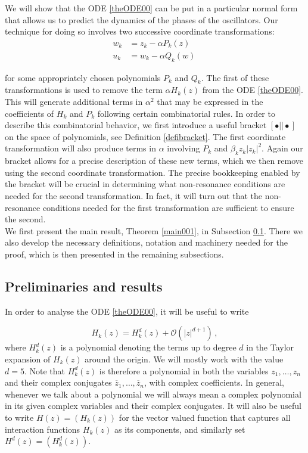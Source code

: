 \documentclass[12pt]{article}
\renewcommand{\mathcal}{\mathscr}
\theoremstyle{plain}
\theoremstyle{definition}
\theoremstyle{remark}
\theoremstyle{remark}
\begin{document}
We will show that the ODE \eqref{theODE00} can be put in a particular normal form that allows us to predict the dynamics of the phases of the oscillators. Our technique for doing so involves two successive coordinate transformations:
\begin{align}
  w_k &= z_k - \alpha P_k(z) \\ \nonumber
  u_k &= w_k - \alpha Q_k(w)\,
\end{align}

\noindent
for some appropriately chosen polynomials $P_k$ and $Q_k$. The first of these transformations is used to remove the term $\alpha H_k(z)$ from the ODE \eqref{theODE00}. This will generate additional terms in $\alpha^2$ that may be expressed in the coefficients of $H_k$ and $P_k$ following certain combinatorial rules. In order to describe this combinatorial behavior, we first introduce a useful bracket $[\bullet|| \bullet]$ on the space of polynomials, see Definition \ref{defibracket}. The first coordinate transformation will also produce terms in $\alpha$ involving $P_k$ and $\beta_k z_k|z_k|^2$. Again our bracket allows for a precise description of these new terms, which we then remove using the second coordinate transformation. The precise bookkeeping enabled by the bracket will be crucial in determining what non-resonance conditions are needed for the second transformation. In fact, it will turn out that the non-resonance conditions needed for the first transformation are sufficient to ensure the second.\\

We first present the main result, Theorem \ref{main001}, in Subsection \ref{Statementofresultsandpreliminaries}. There we also develop the necessary definitions, notation and machinery needed for the proof, which is then presented in the remaining subsections.


\subsection{Preliminaries and results}\label{Statementofresultsandpreliminaries}
In order to analyse the ODE \eqref{theODE00}, it will be useful to write 

\[
H_k(z) =  {H}^d_k(z) +  \mathcal{O}(|z|^{d+1})\, ,
\]
where ${H}^d_k(z)$ is a polynomial denoting the terms up to degree $d$ in the Taylor expansion of $H_k(z)$ around the origin. We will mostly work with the value $d=5$. Note that ${H}^d_k(z)$ is therefore a polynomial in both the variables $z_1, \dots, z_n$ and their complex conjugates $\overline{z}_1, \dots, \overline{z}_n$, with complex coefficients. In general, whenever we talk about a polynomial we will always mean a complex polynomial in its given complex variables and their complex conjugates. It will also be useful to write $H(z) = (H_k(z))$ for the vector valued function that captures all interaction functions $H_k(z)$ as its components, and similarly set $H^d(z) = (H^d_k(z))$. 
\end{document}
